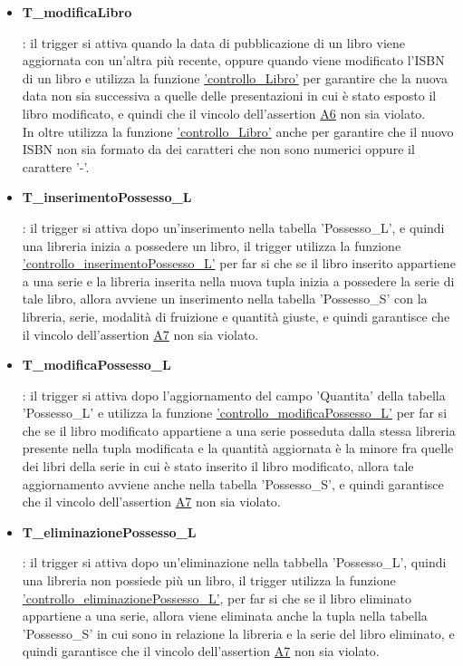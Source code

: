 \documentclass{article}
\begin{document}
\begin{itemize}
   \item \hypertarget{t17}{\textbf{T\_modificaLibro}}: il trigger si attiva quando la data di pubblicazione di un libro viene aggiornata con un'altra più recente, oppure quando viene modificato l'ISBN di un libro e utilizza la funzione \hyperlink{f17}{'controllo\_Libro'} per garantire che la nuova data non sia successiva a quelle delle presentazioni in cui è stato esposto il libro modificato, e quindi che il vincolo dell'assertion \hyperlink{assertion6}{A6} non sia violato.\\
   In oltre utilizza la funzione \hyperlink{f17}{'controllo\_Libro'} anche per garantire che il nuovo ISBN non sia formato da dei caratteri che non sono numerici oppure il carattere '-'.

   \item \hypertarget{t18}{\textbf{T\_inserimentoPossesso\_L}}: il trigger si attiva dopo un'inserimento nella tabella 'Possesso\_L', e quindi una libreria inizia a possedere un libro, il trigger utilizza la funzione \hyperlink{f18}{'controllo\_inserimentoPossesso\_L'} per far si che se il libro inserito appartiene a una serie e la libreria inserita nella nuova tupla inizia a possedere la serie di tale libro, allora avviene un inserimento nella tabella 'Possesso\_S' con la libreria, serie, modalità di fruizione e quantità giuste, e quindi garantisce che il vincolo dell'assertion \hyperlink{assertion7}{A7} non sia violato. 

   \item \hypertarget{t19}{\textbf{T\_modificaPossesso\_L}}: il trigger si attiva dopo l'aggiornamento del campo 'Quantita' della tabella 'Possesso\_L' e utilizza la funzione \hyperlink{f19}{'controllo\_modificaPossesso\_L'} per far si che se il libro modificato appartiene a una serie posseduta dalla stessa libreria presente nella tupla modificata e la quantità aggiornata è la minore fra quelle dei libri della serie in cui è stato inserito il libro modificato, allora tale aggiornamento avviene anche nella tabella 'Possesso\_S', e quindi garantisce che il vincolo dell'assertion \hyperlink{assertion7}{A7} non sia violato.

   \item \hypertarget{t20}{\textbf{T\_eliminazionePossesso\_L}}: il trigger si attiva dopo un'eliminazione nella tabbella 'Possesso\_L', quindi una libreria non possiede più un libro, il trigger utilizza la funzione \hyperlink{f20}{'controllo\_eliminazionePossesso\_L'}, per far si che se il libro eliminato appartiene a una serie, allora viene eliminata anche la tupla nella tabella 'Possesso\_S' in cui sono in relazione la libreria e la serie del libro eliminato, e quindi garantisce che il vincolo dell'assertion \hyperlink{assertion7}{A7} non sia violato. 


\end{itemize}
\end{document}
